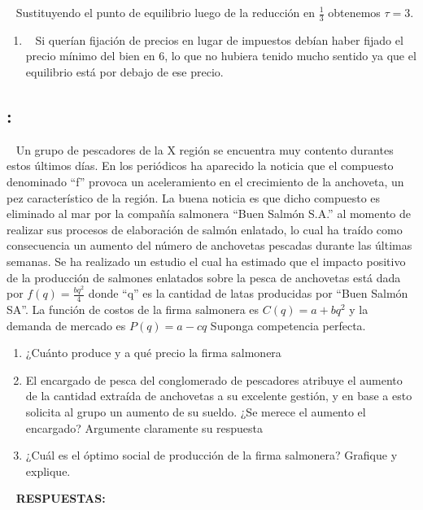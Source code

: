 \documentclass[
  letterpaper,
  DIV=11,
  numbers=noendperiod]{scrreport}
\providecommand{\tightlist}{%
  \setlength{\itemsep}{0pt}\setlength{\parskip}{0pt}}\usepackage{longtable,booktabs,array}
\begin{document}
~ Sustituyendo el punto de equilibrio luego de la reducción en
\(\frac{1}{3}\) obtenemos \(\tau = 3\).

\begin{enumerate}
\def\labelenumi{\alph{enumi})}
\setcounter{enumi}{1}
\tightlist
\item
  ~ Si querían fijación de precios en lugar de impuestos debían haber
  fijado el precio mínimo del bien en 6, lo que no hubiera tenido mucho
  sentido ya que el equilibrio está por debajo de ese precio.
\end{enumerate}

\hypertarget{section-17}{%
\subsection{:}\label{section-17}}

~ Un grupo de pescadores de la X región se encuentra muy contento
durantes estos últimos días. En los periódicos ha aparecido la noticia
que el compuesto denominado ``f'' provoca un aceleramiento en el
crecimiento de la anchoveta, un pez característico de la región. La
buena noticia es que dicho compuesto es eliminado al mar por la compañía
salmonera ``Buen Salmón S.A.'' al momento de realizar sus procesos de
elaboración de salmón enlatado, lo cual ha traído como consecuencia un
aumento del número de anchovetas pescadas durante las últimas semanas.
Se ha realizado un estudio el cual ha estimado que el impacto positivo
de la producción de salmones enlatados sobre la pesca de anchovetas está
dada por \(f(q) = \frac{bq^2}{4}\) donde ``q'' es la cantidad de latas
producidas por ``Buen Salmón SA''. La función de costos de la firma
salmonera es \(C(q) = a + bq^2\) y la demanda de mercado es
\(P(q) = a - cq\) Suponga competencia perfecta.

\begin{enumerate}
\def\labelenumi{\alph{enumi})}
\item
  ¿Cuánto produce y a qué precio la firma salmonera
\item
  El encargado de pesca del conglomerado de pescadores atribuye el
  aumento de la cantidad extraída de anchovetas a su excelente gestión,
  y en base a esto solicita al grupo un aumento de su sueldo. ¿Se merece
  el aumento el encargado? Argumente claramente su respuesta
\item
  ¿Cuál es el óptimo social de producción de la firma salmonera?
  Grafique y explique.
\end{enumerate}

~ \textbf{RESPUESTAS:}
\end{document}
